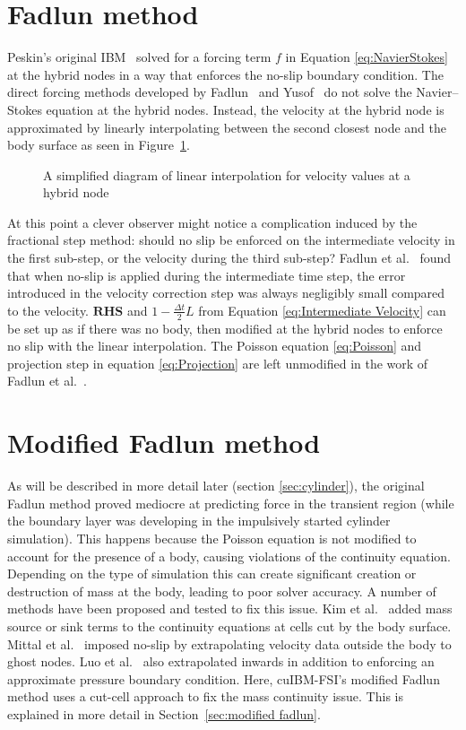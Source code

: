 \section{Fadlun method}
Peskin's original IBM~\cite{Peskin:1972gh} solved for a forcing term $f$ in Equation \eqref{eq:NavierStokes} at the hybrid nodes in a way that enforces the no-slip boundary condition. 
The direct forcing methods developed by Fadlun~\cite{Fadlun:2000fl} and Yusof~\cite{MohdYusof:1997wh} do not solve the Navier--Stokes equation at the hybrid nodes. 
Instead, the velocity at the hybrid node is approximated by linearly interpolating between the second closest node and the body surface as seen in Figure~\ref{fig:2}. 
\begin{figure}[!htb]
	\centering
	
	\caption{A simplified diagram of linear interpolation for velocity values at a hybrid node}
	\label{fig:2}
\end{figure}
At this point a clever observer might notice a complication induced by the fractional step method: should no slip be enforced on the intermediate velocity in the first sub-step, or the velocity during the third sub-step? 
Fadlun et al.~\cite{Fadlun:2000fl} found that when no-slip is applied during the intermediate time step, the error introduced in the velocity correction step was always negligibly small compared to the velocity. 
$\textbf{RHS}$ and $1-\frac{\Delta t}{2}L$ from Equation \eqref{eq:Intermediate Velocity} can be set up as if there was no body, then modified at the hybrid nodes to enforce no slip with the linear interpolation. 
The Poisson equation \eqref{eq:Poisson} and projection step in equation \eqref{eq:Projection} are left unmodified in the work of Fadlun et al.~\cite{Fadlun:2000fl}. 

\section{Modified Fadlun method} 
As will be described in more detail later (section \ref{sec:cylinder}), the original Fadlun method proved mediocre at predicting force in the transient region (while the boundary layer was developing in the impulsively started cylinder simulation). 
This happens because the Poisson equation is not modified to account for the presence of a body, causing violations of the continuity equation. 
Depending on the type of simulation this can create significant creation or destruction of mass at the body, leading to poor solver accuracy. 
A number of methods have been proposed and tested to fix this issue. 
Kim et al.~\cite{kim2001immersed} added mass source or sink terms to the continuity equations at cells cut by the body surface. 
Mittal et al.~\cite{mittal2008versatile} imposed no-slip by extrapolating velocity data outside the body to ghost nodes. 
Luo et al.~\cite{Luo:2012gx} also extrapolated inwards in addition to enforcing an approximate pressure boundary condition. 
Here, cuIBM-FSI's modified Fadlun method uses a cut-cell approach to fix the mass continuity issue. 
This is explained in more detail in Section~\ref{sec:modified fadlun}.

